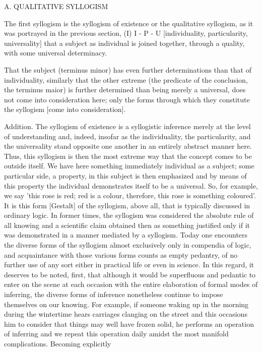 A. QUALITATIVE SYLLOGISM

The first syllogism is the syllogism of existence or the qualitative syllogism,
as it was portrayed in the previous section, (I) I - P - U
[individuality, particularity, universality]
that a subject as individual is joined together, through a quality,
with some universal determinacy.

    That the subject (terminus minor) has even further determinations than
    that of individuality, similarly that the other extreme
    (the predicate of the conclusion, the terminus maior) is
    further determined than being merely a universal,
    does not come into consideration here;
    only the forms through which they constitute the syllogism [come into consideration].

Addition. The syllogism of existence is a syllogistic inference merely at the level of
understanding and, indeed, insofar as the individuality, the particularity, and the
universality stand opposite one another in an entirely abstract manner here. Thus,
this syllogism is then the most extreme way that the concept comes to be outside
itself. We have here something immediately individual as a subject; some particular
side, a property, in this subject is then emphasized and by means of this property
the individual demonstrates itself to be a universal. So, for example, we say 'this
rose is red; red is a colour, therefore, this rose is something coloured'. It is this form
[Gestalt] of the syllogism, above all, that is typically discussed in ordinary logic. In
former times, the syllogism was considered the absolute rule of all knowing and a
scientific claim obtained then as something justified only if it was demonstrated
in a manner mediated by a syllogism. Today one encounters the diverse forms
of the syllogism almost exclusively only in compendia of logic, and acquaintance
with those various forms counts as empty pedantry, of no further use of any sort
either in practical life or even in science. In this regard, it deserves to be noted,
first, that although it would be superfluous and pedantic to enter on the scene at
each occasion with the entire elaboration of formal modes of inferring, the diverse
forms of inference nonetheless continue to impose themselves on our knowing.
For example, if someone waking up in the morning during the wintertime hears
carriages clanging on the street and this occasions him to consider that things
may well have frozen solid, he performs an operation of inferring and we repeat
this operation daily amidst the most manifold complications. Becoming explicitly
